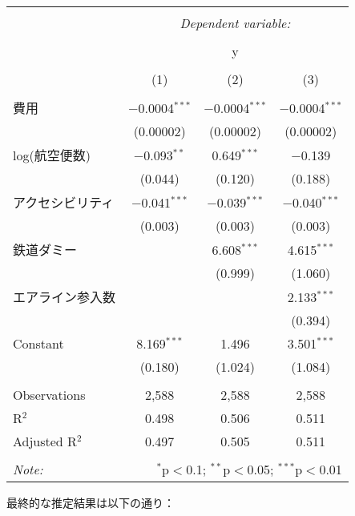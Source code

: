 \documentclass{jsarticle}
\begin{document}
\begin{table}[!htbp] \centering 
  \caption{} 
  \label{} 
\begin{tabular}{@{\extracolsep{5pt}}lccc} 
\\[-1.8ex]\hline 
\hline \\[-1.8ex] 
 & \multicolumn{3}{c}{\textit{Dependent variable:}} \\ 
\cline{2-4} 
\\[-1.8ex] & \multicolumn{3}{c}{y} \\ 
\\[-1.8ex] & (1) & (2) & (3)\\ 
\hline \\[-1.8ex] 
 費用 & $-$0.0004$^{***}$ & $-$0.0004$^{***}$ & $-$0.0004$^{***}$ \\ 
  & (0.00002) & (0.00002) & (0.00002) \\ 
  log(航空便数) & $-$0.093$^{**}$ & 0.649$^{***}$ & $-$0.139 \\ 
  & (0.044) & (0.120) & (0.188) \\ 
  アクセシビリティ & $-$0.041$^{***}$ & $-$0.039$^{***}$ & $-$0.040$^{***}$ \\ 
  & (0.003) & (0.003) & (0.003) \\ 
  鉄道ダミー &  & 6.608$^{***}$ & 4.615$^{***}$ \\ 
  &  & (0.999) & (1.060) \\ 
  エアライン参入数 &  &  & 2.133$^{***}$ \\ 
  &  &  & (0.394) \\ 
  Constant & 8.169$^{***}$ & 1.496 & 3.501$^{***}$ \\ 
  & (0.180) & (1.024) & (1.084) \\ 
 \hline \\[-1.8ex] 
Observations & 2,588 & 2,588 & 2,588 \\ 
R$^{2}$ & 0.498 & 0.506 & 0.511 \\ 
Adjusted R$^{2}$ & 0.497 & 0.505 & 0.511 \\ 
\hline 
\hline \\[-1.8ex] 
\textit{Note:}  & \multicolumn{3}{r}{$^{*}$p$<$0.1; $^{**}$p$<$0.05; $^{***}$p$<$0.01} \\ 
\end{tabular} 
\end{table}

最終的な推定結果は以下の通り：
\end{document}
